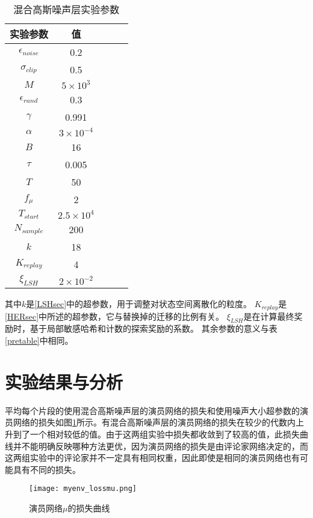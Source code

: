     \begin{table}[htbp]
        \caption{混合高斯噪声层实验参数}
        \label{fcntable}
    \vspace{0.5em}\centering\wuhao
    \begin{tabular}{ccccc}
    \toprule[1.5pt]
    实验参数 & 值\\
    \midrule[1pt]
        $\epsilon_{noise}$ & 0.2\\
        $\sigma_{clip}$ & 0.5\\
        $M$ & $5\times 10^3$\\
        $\epsilon_{rand}$ & 0.3\\
        $\gamma$ & 0.991\\
        $\alpha$ & $3\times 10^{-4}$\\
        $B$ & 16\\
        $\tau$ & 0.005\\
        $T$ & 50\\
        $f_\mu$ & 2\\
        $T_{start}$ & $2.5\times 10^4$\\
        $N_{sample}$ & 200 \\
        $k$ & 18\\
        $K_{replay}$ & 4\\
        $\xi_{LSH}$ & $2\times 10^{-2}$\\
    \bottomrule[1.5pt]
    \end{tabular}
    \end{table}
    其中$k$是\ref{LSHsec}中的超参数，用于调整对状态空间离散化的粒度。
    $K_{replay}$是\ref{HERsec}中所述的超参数，它与替换掉的迁移的比例有关。
    $\xi_{LSH}$是在计算最终奖励时，基于局部敏感哈希和计数的探索奖励的系数。
    其余参数的意义与表\ref{pretable}中相同。

\section{实验结果与分析}
    平均每个片段的使用混合高斯噪声层的演员网络的损失和使用噪声大小超参数的演员网络的损失如图\ref{fcn_lossmu}所示。有混合高斯噪声层的演员网络的损失在较少的代数内上升到了一个相对较低的值。由于这两组实验中损失都收敛到了较高的值，此损失曲线并不能明确反映哪种方法更优，因为演员网络的损失是由评论家网络决定的，而这两组实验中的评论家并不一定具有相同权重，因此即使是相同的演员网络也有可能具有不同的损失。

        \begin{figure}
        \centering
        \texttt{[image: myenv\_lossmu.png]}
        \caption{演员网络$\mu$的损失曲线}
            \label{fcn_lossmu}
        \end{figure}

